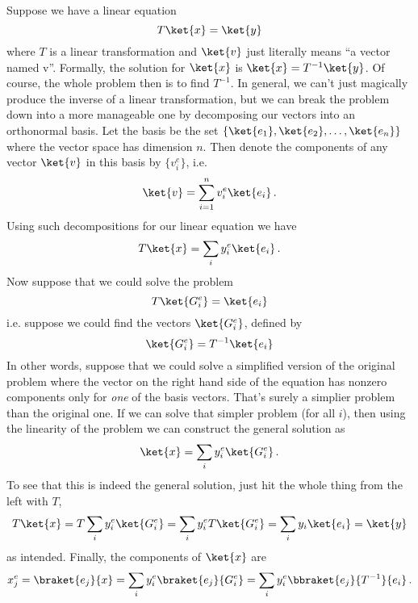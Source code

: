 Suppose we have a linear equation
\begin{equation*}
  T \ket{x} = \ket{y}
\end{equation*}
where $T$ is a linear transformation and $\ket{v}$ just literally means ``a vector named v''.
Formally, the solution for $\ket{x}$ is $\ket{x} = T^{-1} \ket{y}$.
Of course, the whole problem then is to find $T^{-1}$.
In general, we can't just magically produce the inverse of a linear transformation, but we can break the problem down into a more manageable one by decomposing our vectors into an orthonormal basis.
Let the basis be the set $\{\ket{e_1}, \ket{e_2},\ldots,\ket{e_n} \}$ where the vector space has dimension $n$. Then denote the components of any vector $\ket{v}$ in this basis by $\{v_i^e\}$, i.e.
\begin{equation*}
  \ket{v} = \sum_{i=1}^n v_i^e \ket{e_i}
  \, .
\end{equation*}
Using such decompositions for our linear equation we have
\begin{equation*}
  T \ket{x} = \sum_i y_i^e \ket{e_i}
  \, .
\end{equation*}
Now suppose that we could solve the problem
\begin{equation*}
  T \ket{G_i^e} = \ket{e_i}
\end{equation*}
i.e. suppose we could find the vectors $\ket{G_i^e}$, defined by
\begin{equation*}
  \ket{G_i^e} = T^{-1}\ket{e_i}
\end{equation*}
In other words, suppose that we could solve a simplified version of the original problem where the vector on the right hand side of the equation has nonzero components only for \emph{one} of the basis vectors.
That's surely a simplier problem than the original one.
If we can solve that simpler problem (for all $i$), then using the linearity of the problem we can construct the general solution
as
\begin{equation*}
  \ket{x} = \sum_i y_i^e \ket{G_i^e}
  \, .
\end{equation*}
To see that this is indeed the general solution, just hit the whole thing from the left with $T$,
\begin{equation*}
  T \ket{x}
  = T \sum_i y_i^e \ket{G_i^e}
  = \sum_i y_i^e T \ket{G_i^e}
  = \sum_i y_i \ket{e_i}
  = \ket{y}
\end{equation*}
as intended.
Finally, the components of $\ket{x}$ are
\begin{equation*}
  x_j^e
  = \braket{e_j}{x}
  = \sum_i y_i^e \braket{e_j}{G_i^e}
  = \sum_i y_i^e \bbraket{e_j}{T^{-1}}{e_i}
  \, .
\end{equation*}
